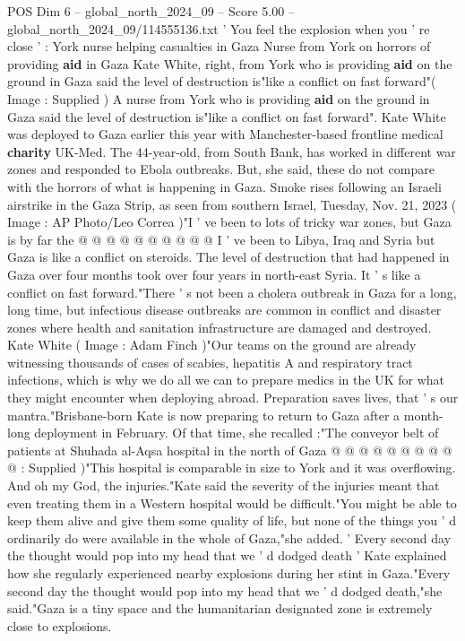 \begin{textsample}{POS Dim 6 – global\_north\_2024\_09 – Score 5.00 – global\_north\_2024\_09/114555136.txt}  \label{ex:f6_pos_427}
' You feel the explosion when you ' re close ' : York nurse helping casualties in Gaza Nurse from York on horrors of providing \textbf{aid} in Gaza Kate White, right, from York who is providing \textbf{aid} on the ground in Gaza said the level of destruction is"like a conflict on fast forward"( Image : Supplied ) A nurse from York who is providing \textbf{aid} on the ground in Gaza said the level of destruction is"like a conflict on fast forward".
Kate White was deployed to Gaza earlier this year with Manchester-based frontline medical \textbf{charity} UK-Med.
The 44-year-old, from South Bank, has worked in different war zones and responded to Ebola outbreaks.
But, she said, these do not compare with the horrors of what is happening in Gaza.
Smoke rises following an Israeli airstrike in the Gaza Strip, as seen from southern Israel, Tuesday, Nov. 21, 2023 ( Image : AP Photo/Leo Correa )"I ' ve been to lots of tricky war zones, but Gaza is by far the @ @ @ @ @ @ @ @ @ @ I ' ve been to Libya, Iraq and Syria but Gaza is like a conflict on steroids.
The level of destruction that had happened in Gaza over four months took over four years in north-east Syria.
It ' s like a conflict on fast forward."There ' s not been a cholera outbreak in Gaza for a long, long time, but infectious disease outbreaks are common in conflict and disaster zones where health and sanitation infrastructure are damaged and destroyed.
Kate White ( Image : Adam Finch )"Our teams on the ground are already witnessing thousands of cases of scabies, hepatitis A and respiratory tract infections, which is why we do all we can to prepare medics in the UK for what they might encounter when deploying abroad.
Preparation saves lives, that ' s our mantra."Brisbane-born Kate is now preparing to return to Gaza after a month-long deployment in February.
Of that time, she recalled :"The conveyor belt of patients at Shuhada al-Aqsa hospital in the north of Gaza @ @ @ @ @ @ @ @ @ @ : Supplied )"This hospital is comparable in size to York and it was overflowing.
And oh my God, the injuries."Kate said the severity of the injuries meant that even treating them in a Western hospital would be difficult."You might be able to keep them alive and give them some quality of life, but none of the things you ' d ordinarily do were available in the whole of Gaza,"she added. ' Every second day the thought would pop into my head that we ' d dodged death ' Kate explained how she regularly experienced nearby explosions during her stint in Gaza."Every second day the thought would pop into my head that we ' d dodged death,"she said."Gaza is a tiny space and the humanitarian designated zone is extremely close to explosions.

\end{textsample}
